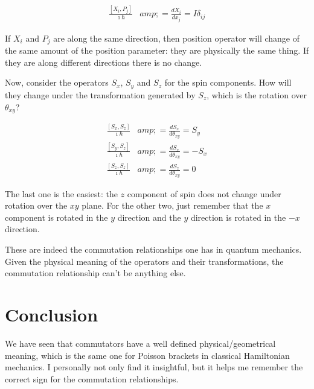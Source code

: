 \documentclass[aps,pra,10pt,floatfix,nofootinbib]{revtex4-1}
\theoremstyle{definition}
\begin{document}
\begin{equation}
\begin{aligned}
\frac{[X_i,P_j]}{\imath \hbar} &amp;= \frac{dX_i}{dx_j}=I \delta_{ij}
\end{aligned}
\end{equation}

If $X_i$ and $P_j$ are along the same direction, then position operator will change of the same amount of the position parameter: they are physically the same thing. If they are along different directions there is no change.

Now, consider the operators $S_x$, $S_y$ and $S_z$ for the spin components. How will they change under the transformation generated by $S_z$, which is the rotation over $\theta_{xy}$?

\begin{equation}
\begin{aligned}
\frac{[S_x,S_z]}{\imath \hbar} &amp;= \frac{dS_x}{d\theta_{xy}} = S_y \\
\frac{[S_y,S_z]}{\imath \hbar} &amp;= \frac{dS_x}{d\theta_{xy}} = - S_x \\
\frac{[S_z,S_z]}{\imath \hbar} &amp;= \frac{dS_z}{d\theta_{xy}} = 0
\end{aligned}
\end{equation}

The last one is the easiest: the $z$ component of spin does not change under rotation over the $xy$ plane. For the other two, just remember that the $x$ component is rotated in the $y$ direction and the $y$ direction is rotated in the $-x$ direction.

These are indeed the commutation relationships one has in quantum mechanics. Given the physical meaning of the operators and their transformations, the commutation relationship can't be anything else.

\section{Conclusion}

We have seen that commutators have a well defined physical/geometrical meaning, which is the same one for Poisson brackets in classical Hamiltonian mechanics. I personally not only find it insightful, but it helps me remember the correct sign for the commutation relationships.
\end{document}
